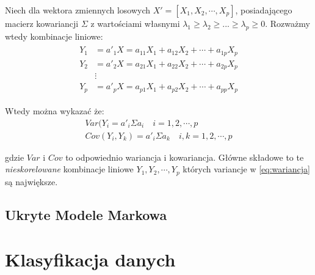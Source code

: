 Niech dla wektora zmiennych losowych $X'=[X_{1}, X_{2}, \cdots, X_{p}]$, posiadającego macierz kowariancji $\Sigma$ z wartościami własnymi $\lambda_{1} \geqslant \lambda_{2} \geqslant ... \geqslant \lambda_{p}
\geqslant 0$. Rozważmy wtedy kombinacje liniowe:
\begin{align}
    \begin{split}
        Y_{1} &= a'_{1}X = a_{11}X_{1} + a_{12}X_{2} + \cdots + a_{1p}X_{p} \\
        Y_{2} &= a'_{2}X = a_{21}X_{1} + a_{22}X_{2} + \cdots + a_{2p}X_{p} \\
        &\vdots \\
        Y_{p} &= a'_{p}X = a_{p1}X_{1} + a_{p2}X_{2} + \cdots + a_{pp}X_{p}
    \end{split}
\end{align}

Wtedy można wykazać że:
\begin{align}
    Var(Y_{i} = a'_{i}\Sigma a_{i} \quad i = 1,2, \cdots, p 
    \label{eq:wariancja} \\
    Cov(Y_{i}, Y_{k}) = a'_{i} \Sigma a_{k} \quad i,k = 1,2, \cdots, p
\end{align}

gdzie $Var$ i $Cov$ to odpowiednio wariancja i kowariancja. Główne składowe to te \textit{nieskorelowane} kombinacje liniowe $Y_{1}, Y_{2}, \cdots, Y_{p}$ których variancje w \ref{eq:wariancja} są
największe.


\subsection{Ukryte Modele Markowa}

\section{Klasyfikacja danych}
